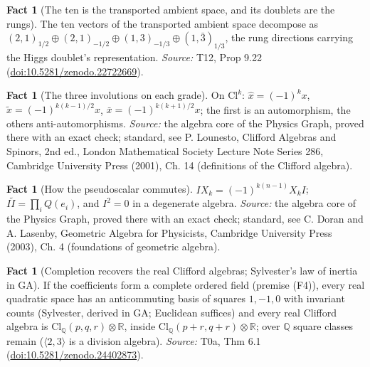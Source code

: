\documentclass[11pt]{article}
\theoremstyle{definition}
\newtheorem{fact}[theorem]{Fact}
\theoremstyle{plain}
\providecommand{\Cl}{}\renewcommand{\Cl}{\mathrm{Cl}}
\providecommand{\Q}{}\renewcommand{\Q}{\mathbb{Q}}
\providecommand{\R}{}\renewcommand{\R}{\mathbb{R}}
\begin{document}
\begin{fact}[The ten is the transported ambient space, and its doublets are the rungs]\label{c:standard-model.ten-transported-ambient-space-doublets-are}
The ten vectors of the transported ambient space decompose as $(2,1)_{1/2} \oplus (2,1)_{-1/2} \oplus (1,3)_{-1/3} \oplus (1,\bar{3})_{1/3}$, the rung directions carrying the Higgs doublet's representation.
\emph{Source:} T12, Prop 9.22 (\href{https://doi.org/10.5281/zenodo.22722669}{doi:10.5281/zenodo.22722669}).
\end{fact}

\begin{fact}[The three involutions on each grade]\label{c:std-algebra.involution-properties}
On $\Cl^{k}$: $\hat{x} = (-1)^{k}x$, $\tilde{x} = (-1)^{k(k-1)/2}x$, $\bar{x} = (-1)^{k(k+1)/2}x$; the first is an automorphism, the others anti-automorphisms.
\emph{Source:} the algebra core of the Physics Graph, proved there with an exact check; standard, see P. Lounesto, Clifford Algebras and Spinors, 2nd ed., London Mathematical Society Lecture Note Series 286, Cambridge University Press (2001), Ch. 14 (definitions of the Clifford algebra).
\end{fact}

\begin{fact}[How the pseudoscalar commutes]\label{c:std-algebra.pseudoscalar-commutation}
$I X_k = (-1)^{k(n-1)} X_k I$; $I\tilde{I} = \prod_i Q(e_i)$, and $I^{2} = 0$ in a degenerate algebra.
\emph{Source:} the algebra core of the Physics Graph, proved there with an exact check; standard, see C. Doran and A. Lasenby, Geometric Algebra for Physicists, Cambridge University Press (2003), Ch. 4 (foundations of geometric algebra).
\end{fact}

\begin{fact}[Completion recovers the real Clifford algebras; Sylvester's law of inertia in GA]\label{c:synthesis.completion-recovers-the-real-clifford-algebras}
If the coefficients form a complete ordered field (premise (F4)), every real quadratic space has an anticommuting basis of squares $1, -1, 0$ with invariant counts (Sylvester, derived in GA; Euclidean suffices) and every real Clifford algebra is $\Cl_{\Q}(p,q,r) \otimes \R$, inside $\Cl_{\Q}(p{+}r,q{+}r) \otimes \R$; over $\Q$ square classes remain ($\langle 2, 3\rangle$ is a division algebra).
\emph{Source:} T0a, Thm 6.1 (\href{https://doi.org/10.5281/zenodo.24402873}{doi:10.5281/zenodo.24402873}).
\end{fact}
\end{document}
